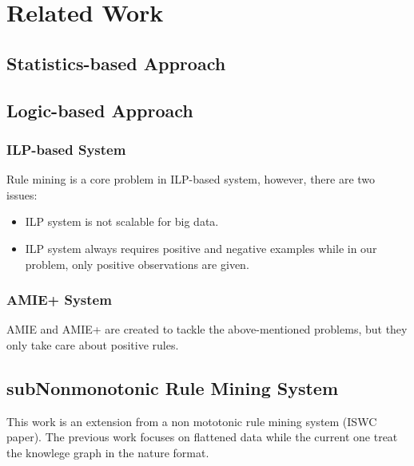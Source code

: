 \chapter{Related Work}

\section{Statistics-based Approach}

\section{Logic-based Approach}

\subsection{ILP-based System}

Rule mining is a core problem in ILP-based system, however, there are two issues:

\begin{itemize}
	\item ILP system is not scalable for big data.
	\item ILP system always requires positive and negative examples while in our problem, only positive observations are given.
\end{itemize}

\subsection{AMIE+ System}

AMIE and AMIE+ are created to tackle the above-mentioned problems, but they only take care about positive rules.

\section{subNonmonotonic Rule Mining System}

This work is an extension from a non mototonic rule mining system (ISWC paper). The previous work focuses on flattened data while the current one treat the knowlege graph in the nature format.
